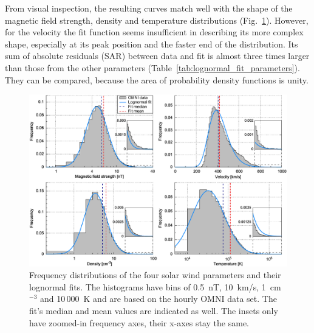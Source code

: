 
From visual inspection, the resulting curves match well with the shape of the magnetic field strength, density and temperature distributions (Fig.~\ref{fig:histogram_fits_4_a_zoom_paper_pdfplot}). However, for the velocity the fit function seems insufficient in describing its more complex shape, especially at its peak position and the faster end of the distribution. Its sum of absolute residuals (SAR) between data and fit is almost three times larger than those from the other parameters (Table~\ref{tab:lognormal_fit_parameters}). They can be compared, because the area of probability density functions is unity.
\begin{figure}
	\includegraphics[width=18cm]{figures/histogram_fits_4_a_zoom_paper_pdfplot.pdf}
	\caption{Frequency distributions of the four solar wind parameters and their lognormal fits. The histograms have bins of 0.5~nT, 10~km/s, 1~cm$^{-3}$ and 10\,000~K and are based on the hourly OMNI data set. The fit's median and mean values are indicated as well. The insets only have zoomed-in frequency axes, their x-axes stay the same.}
	\label{fig:histogram_fits_4_a_zoom_paper_pdfplot}
\end{figure}

